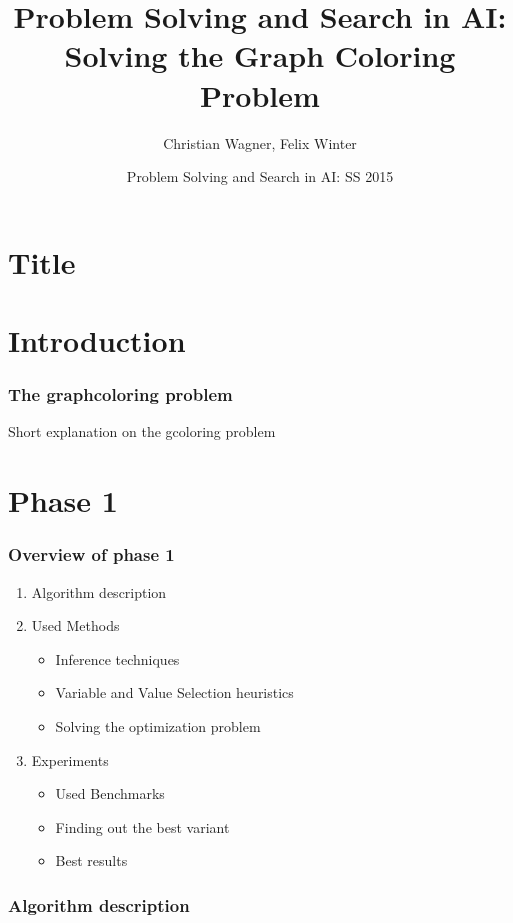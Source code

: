 \documentclass{beamer}
\title[Solving the Graph Coloring Problem] %
{Problem Solving and Search in AI: Solving the Graph Coloring
Problem}
\author{Christian Wagner, Felix Winter}
\institute
{
  TU Wien  
}
\date[SS 2015] %
{Problem Solving and Search in AI: SS 2015}
\begin{document}
\section{Title}
  \frame{\titlepage}


\section{Introduction}

\begin{frame}
  \frametitle{The graphcoloring problem}


  Short explanation on the gcoloring problem
  \end{frame}


\section{Phase 1}
  \begin{frame}
    \frametitle{Overview of phase 1}

    \begin{enumerate}
      \item Algorithm description
      \item Used Methods
        \begin{itemize}
        \item{Inference techniques}
        \item{Variable and Value Selection heuristics}
        \item{Solving the optimization problem}
        \end{itemize}
        
      \item{Experiments}
        \begin{itemize}
        \item{Used Benchmarks}
        \item{Finding out the best variant}
        \item{Best results}
        \end{itemize}

    \end{enumerate}
  \end{frame}


  \begin{frame}
    \frametitle{Algorithm description}


  \end{frame}

  
\end{document}
